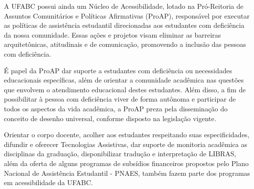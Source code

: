 A UFABC possui ainda um Núcleo de Acessibilidade, lotado na Pró-Reitoria de
Assuntos Comunitários e Políticas Afirmativas (ProAP), responsável por executar
as políticas de assistência estudantil direcionadas aos estudantes com
deficiência da nossa comunidade.
Essas ações e projetos visam eliminar as barreiras arquitetônicas, atitudinais
e de comunicação, promovendo a inclusão das pessoas com deficiência. 

É papel da ProAP dar suporte a estudantes com deficiência ou necessidades
educacionais específicas, além de orientar a comunidade acadêmica nas questões
que envolvem o atendimento educacional destes estudantes. 
Além disso, a fim de possibilitar à pessoa com deficiência viver de forma
autônoma e participar de todos os aspectos da vida acadêmica, a ProAP preza
pela disseminação do conceito de desenho universal, conforme disposto na
legislação vigente. 

Orientar o corpo docente, acolher aos estudantes respeitando suas
especificidades, difundir e oferecer Tecnologias Assistivas, dar suporte de
monitoria acadêmica as disciplinas da graduação, disponibilizar tradução e
interpretação de LIBRAS, além da oferta de alguns programas de subsídios
financeiros propostos pelo Plano Nacional de Assistência Estudantil - PNAES,
também fazem parte dos programas em acessibilidade da UFABC.
